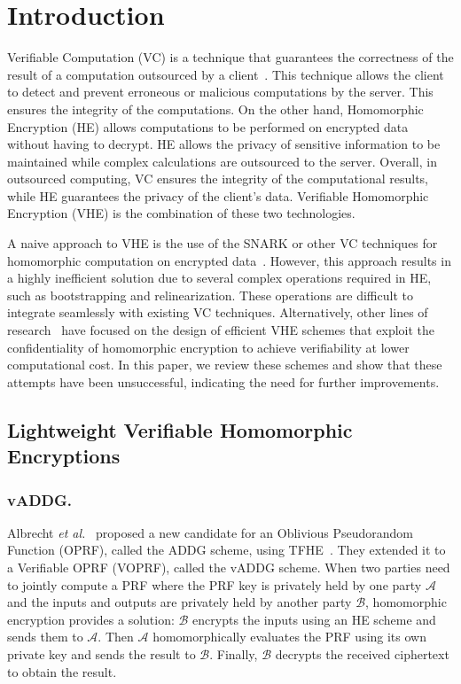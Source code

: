 \documentclass[runningheads]{llncs}
\begin{document}

\section{Introduction}
Verifiable Computation (VC) is a technique that guarantees the correctness of the result of a computation outsourced by a client~\cite{First_VC}. This technique allows the client to detect and prevent erroneous or malicious computations by the server. This ensures the integrity of the computations. On the other hand, Homomorphic Encryption (HE) allows computations to be performed on encrypted data without having to decrypt. HE allows the privacy of sensitive information to be maintained while complex calculations are outsourced to the server. Overall, in outsourced computing, VC ensures the integrity of the computational results, while HE guarantees the privacy of the client's data. Verifiable Homomorphic Encryption (VHE) is the combination of these two technologies.

A naive approach to VHE is the use of the SNARK or other VC techniques for homomorphic computation on encrypted data~\cite{SnarkVHE}. However, this approach results in a highly inefficient solution due to several complex operations required in HE, such as bootstrapping and relinearization. These operations are difficult to integrate seamlessly with existing VC techniques. Alternatively, other lines of research~\cite{VE, cryptoeprint:PRF} have focused on the design of efficient VHE schemes that exploit the confidentiality of homomorphic encryption to achieve verifiability at lower computational cost. In this paper, we review these schemes and show that these attempts have been unsuccessful, indicating the need for further improvements.

    \subsection{Lightweight Verifiable Homomorphic Encryptions}
        
        \subsubsection{vADDG.}
        Albrecht {\em et al.}~\cite{cryptoeprint:PRF} proposed a new candidate for an Oblivious Pseudorandom Function (OPRF), called the ADDG scheme, using TFHE~\cite{CGGI}. They extended it to a Verifiable OPRF (VOPRF), called the vADDG scheme.
        When two parties need to jointly compute a PRF where the PRF key is privately held by one party \(\mathcal{A}\) and the inputs and outputs are privately held by another party \(\mathcal{B}\), homomorphic encryption provides a solution: \(\mathcal{B}\) encrypts the inputs using an HE scheme and sends them to \(\mathcal{A}\). Then \(\mathcal{A}\) homomorphically evaluates the PRF using its own private key and sends the result to \(\mathcal{B}\). Finally, \(\mathcal{B}\) decrypts the received ciphertext to obtain the result.
        
\end{document}
